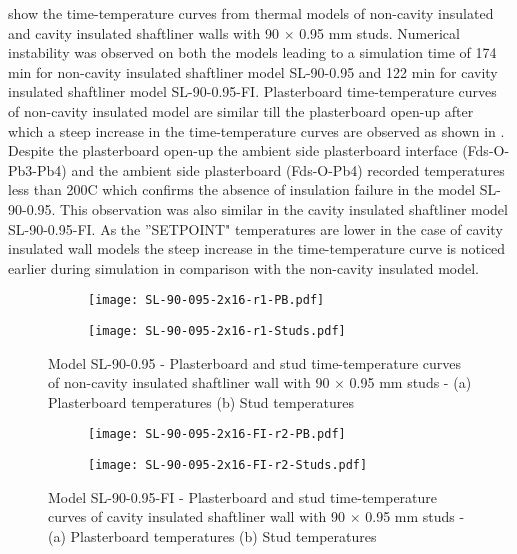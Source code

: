  show the time-temperature curves from thermal models of non-cavity insulated and cavity insulated shaftliner walls with 90 $\times$ 0.95 mm studs. Numerical instability was observed on both the models leading to a simulation time of 174 min for non-cavity insulated shaftliner model SL-90-0.95 and 122 min for cavity insulated shaftliner model SL-90-0.95-FI. Plasterboard time-temperature curves of non-cavity insulated model are similar till the plasterboard open-up after which a steep increase in the time-temperature curves are observed as shown in . Despite the plasterboard open-up the ambient side plasterboard interface (Fds-O-Pb3-Pb4) and the ambient side plasterboard (Fds-O-Pb4) recorded temperatures less than 200\degree C which confirms the absence of insulation failure in the model SL-90-0.95. This observation was also similar in the cavity insulated shaftliner model SL-90-0.95-FI. As the ''SETPOINT" temperatures are lower in the case of cavity insulated wall models the steep increase in the time-temperature curve is noticed earlier during simulation in comparison with the non-cavity insulated model. 
\begin{figure}[!htbp]
	\centering
	\begin{subfigure}[b]{0.6\textwidth}
		\centering
		\texttt{[image: SL-90-095-2x16-r1-PB.pdf]}
		\caption{}
		\label{subfig:SL-90-095-2x16-r1-PB}
	\end{subfigure}
	\begin{subfigure}[b]{0.6\textwidth}
		\centering
		\texttt{[image: SL-90-095-2x16-r1-Studs.pdf]}
		\caption{}
		\label{subfig:SL-90-095-2x16-r1-Studs}
	\end{subfigure}
	   \caption{Model SL-90-0.95 - Plasterboard and stud time-temperature curves of non-cavity insulated shaftliner wall with 90 $\times$ 0.95 mm studs - (a) Plasterboard temperatures (b) Stud temperatures}
	   \label{fig:SL-90-095-2x16-r1}
\end{figure}
\begin{figure}[!htbp]
	\centering
	\begin{subfigure}[b]{0.6\textwidth}
		\centering
		\texttt{[image: SL-90-095-2x16-FI-r2-PB.pdf]}
		\caption{}
		\label{subfig:SL-90-095-2x16-FI-r2-PB}
	\end{subfigure}
	\begin{subfigure}[b]{0.6\textwidth}
		\centering
		\texttt{[image: SL-90-095-2x16-FI-r2-Studs.pdf]}
		\caption{}
		\label{subfig:SL-90-095-2x16-FI-r2-Studs}
	\end{subfigure}
	   \caption{Model SL-90-0.95-FI - Plasterboard and stud time-temperature curves of cavity insulated shaftliner wall with 90 $\times$ 0.95 mm studs - (a) Plasterboard temperatures (b) Stud temperatures}
	   \label{fig:SL-90-095-2x16-FI-r2}
\end{figure}

